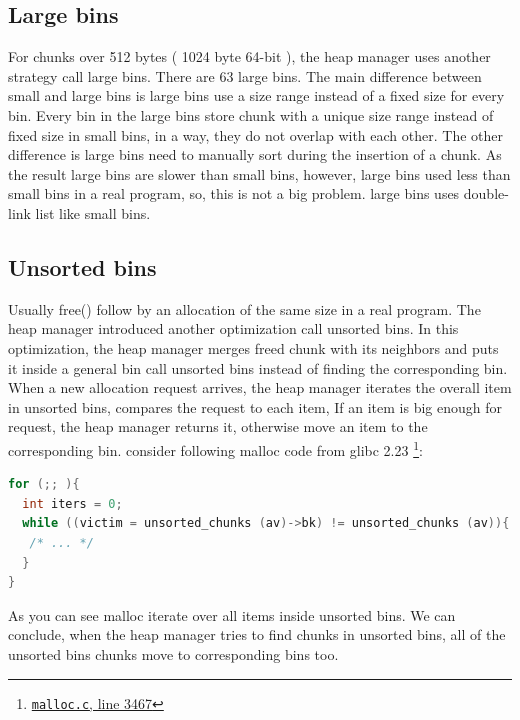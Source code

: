 \documentclass{masterthesis}
\newcommand*\libc{glibc}
\newcommand*\ub{unsorted bins}
\newcommand*\lb{large bins}
\newcommand*\sbs{small bins}
\newcommand*\Ub{Unsorted bins\xspace}
\newcommand*\Lb{Large bins\xspace}
\newcommand{\glnote}[1]{\todo[color=yellow!20]{#1}}
\begin{document}
\subsection{\Lb}
For chunks over 512 bytes ( 1024 byte 64-bit ), the heap manager uses another strategy call \lb{}. There are 63 \lb{}. The main difference between small and \lb{} is \lb{} use a size range instead of a fixed size for every bin. Every bin in the \lb{} store chunk with a unique size range instead of fixed size in \sbs{}, in a way, they do not overlap with each other.
The other difference is \lb{} need to manually sort during the insertion of a chunk. As the result \lb{} are slower than \sbs{}, however, \lb{} used less than \sbs{} in a real program, so, this is not a big problem. \lb{} uses double-link list like \sbs{}. 
\glnote{is this a single or double-linked list?}

\subsection{\Ub}
Usually free() follow by an allocation of the same size in a real program. The heap manager introduced another optimization call \ub{}. In this optimization, the heap manager merges freed chunk with its neighbors and puts it inside a general bin call \ub{} instead of finding the corresponding bin. When a new allocation request arrives, the heap manager iterates the overall item in \ub{}, compares the request to each item, If an item is big enough for request, the heap manager returns it, otherwise move an item to the corresponding bin. consider following malloc code from \libc{} 2.23 \footnote{\href{https://sourceware.org/git/?p=glibc.git;a=blob;f=malloc/malloc.c;hb=ad372e296b6b944884f14fb5d8f3a6195bfba22b\#l3467}{\texttt{malloc.c}, line 3467}}:

\begin{lstlisting}[language=c,frame=tlrb]
for (;; ){
  int iters = 0;
  while ((victim = unsorted_chunks (av)->bk) != unsorted_chunks (av)){
   /* ... */ 
  }
}
\end{lstlisting}

As you can see malloc iterate over all items inside \ub{}. We can conclude, when the heap manager tries to find chunks in \ub{}, all of the \ub{} chunks move to corresponding bins too.
\end{document}
